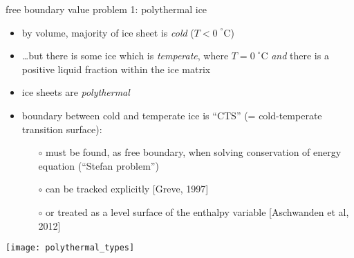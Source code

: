 \begin{frame}{free boundary value problem 1: polythermal ice}

\small
\begin{itemize}
\item by volume, majority of ice sheet is \emph{cold} ($T < 0\phantom{|}^\circ\text{C}$)
\item \dots but there is some ice which is \emph{temperate}, where $T = 0\phantom{|}^\circ\text{C}$ \emph{and} there is a positive liquid fraction within the ice matrix
\item ice sheets are \emph{polythermal}
\item boundary between cold and temperate ice is ``CTS'' (= cold-temperate transition surface):
  \begin{itemize}
  \item[$\circ$] must be found, as free boundary, when solving conservation of energy equation (``Stefan problem'')
  \item[$\circ$] can be tracked explicitly [Greve, 1997]
  \item[$\circ$] or treated as a level surface of the enthalpy variable [Aschwanden et al, 2012]
  \end{itemize}
\end{itemize}

\begin{center}
\texttt{[image: polythermal\_types]}
\end{center}
\end{frame}


